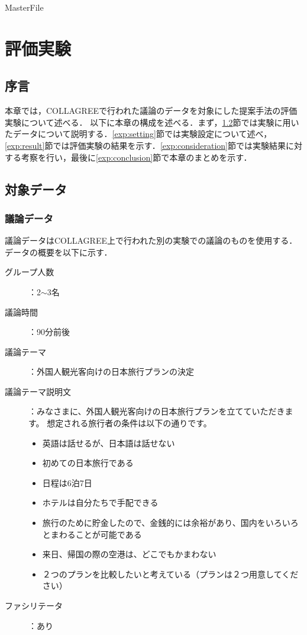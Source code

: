 \expandafter\ifx\csname MasterFile\endcsname\relax
\def\SubFile{hoge}


\setcounter{chapter}{4}
\fi
\cleardoublepage
\chapter{評価実験}
\label{exp:chapter}

\section{序言}
\label{exp:introduction}
本章では，COLLAGREEで行われた議論のデータを対象にした提案手法の評価実験について述べる．%
以下に本章の構成を述べる．まず，\ref{exp:data}節では実験に用いたデータについて説明する．\ref{exp:setting}節では実験設定について述べ，\ref{exp:result}節では評価実験の結果を示す．\ref{exp:consideration}節では実験結果に対する考察を行い，最後に\ref{exp:conclusion}節で本章のまとめを示す．
\clearpage
\section{対象データ}
\label{exp:data}
\subsection{議論データ}
\label{exp:data:discussion}
議論データはCOLLAGREE上で行われた別の実験での議論のものを使用する．データの概要を以下に示す．
\\
\begin{description}
\item [グループ人数]：2$\sim$3名
\item [議論時間]：90分前後
\item [議論テーマ]：外国人観光客向けの日本旅行プランの決定
\item [議論テーマ説明文]：みなさまに、外国人観光客向けの日本旅行プランを立てていただきます。 想定される旅行者の条件は以下の通りです。
\begin{itemize}
\item 英語は話せるが、日本語は話せない
\item 初めての日本旅行である
\item 日程は6泊7日
\item ホテルは自分たちで手配できる
\item 旅行のために貯金したので、金銭的には余裕があり、国内をいろいろとまわることが可能である
\item 来日、帰国の際の空港は、どこでもかまわない
\item ２つのプランを比較したいと考えている（プランは２つ用意してください）
\end{itemize}
\item [ファシリテータ]：あり
\end{description}

